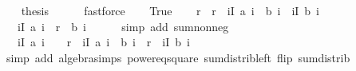 \begin{isabellebody}
\ \ \isamarkupfalse%
\ {\isacharquery}{\kern0pt}thesis\isanewline
\ \ \ \ \isamarkupfalse%
\ fastforce\isanewline
{}\isamarkupfalse%
\isanewline
\ \ \isamarkupfalse%
\ True\isanewline
\ \ \isamarkupfalse%
\ r\ \ {\isachardoublequoteopen}r\ {\isasymequiv}\ {\isacharparenleft}{\kern0pt}{\isasymSum}i{\isasymin}I{\isachardot}{\kern0pt}\ a\ i\ {\isacharasterisk}{\kern0pt}\ b\ i{\isacharparenright}{\kern0pt}\ {\isacharslash}{\kern0pt}\ {\isacharparenleft}{\kern0pt}{\isasymSum}i{\isasymin}I{\isachardot}{\kern0pt}\ {\isacharparenleft}{\kern0pt}b\ i{\isacharparenright}{\kern0pt}\isanewline
\ \ \isamarkupfalse%
\ {\isachardoublequoteopen}{}\ {\isasymle}\ {\isacharparenleft}{\kern0pt}{\isasymSum}i{\isasymin}I{\isachardot}{\kern0pt}\ {\isacharparenleft}{\kern0pt}a\ i\ {\isacharminus}{\kern0pt}\ r\ {\isacharasterisk}{\kern0pt}\ b\ i{\isacharparenright}{\kern0pt}\isanewline
\ \ \ \ \isamarkupfalse%
\ {\isacharparenleft}{\kern0pt}simp\ add{\isacharcolon}{\kern0pt}\ sum{\isacharunderscore}{\kern0pt}nonneg{\isacharparenright}{\kern0pt}\isanewline
\ \ \isamarkupfalse%
\ \isamarkupfalse%
\ {\isachardoublequoteopen}{\isachardot}{\kern0pt}{\isachardot}{\kern0pt}{\isachardot}{\kern0pt}\ {\isacharequal}{\kern0pt}\ {\isacharparenleft}{\kern0pt}{\isasymSum}i{\isasymin}I{\isachardot}{\kern0pt}\ {\isacharparenleft}{\kern0pt}a\ i{\isacharparenright}{\kern0pt}\ {\isacharminus}{\kern0pt}\ {}\ {\isacharasterisk}{\kern0pt}\ r\ {\isacharasterisk}{\kern0pt}\ {\isacharparenleft}{\kern0pt}{\isasymSum}i{\isasymin}I{\isachardot}{\kern0pt}\ a\ i\ {\isacharasterisk}{\kern0pt}\ b\ i{\isacharparenright}{\kern0pt}\ {\isacharplus}{\kern0pt}\ r\ {\isacharasterisk}{\kern0pt}\ {\isacharparenleft}{\kern0pt}{\isasymSum}i{\isasymin}I{\isachardot}{\kern0pt}\ {\isacharparenleft}{\kern0pt}b\ i{\isacharparenright}{\kern0pt}\isanewline
\ \ \ \ \isamarkupfalse%
\ {\isacharparenleft}{\kern0pt}simp\ add{\isacharcolon}{\kern0pt}\ algebra{\isacharunderscore}{\kern0pt}simps\ power{}{\isacharunderscore}{\kern0pt}eq{\isacharunderscore}{\kern0pt}square\ sum{\isacharunderscore}{\kern0pt}distrib{\isacharunderscore}{\kern0pt}left\ flip{\isacharcolon}{\kern0pt}\ sum{\isachardot}{\kern0pt}distrib{\isacharparenright}{\kern0pt}\isanewline

\end{isabellebody}
